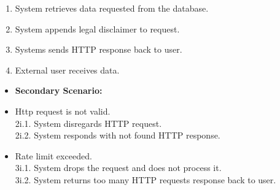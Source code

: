 \documentclass[]{article}
\begin{document}
\begin{enumerate}[{\bf BE1.}]
\begin{enumerate}[1.]
			\item System retrieves data requested from the database.
			\item System appends legal disclaimer to request.
			\item Systems sends HTTP response back to user.
			\item External user receives data.
		\end{enumerate}
		\begin{itemize}
			\item[] {\bf Secondary Scenario:}
			\item[2i.] Http request is not valid. \\
			\hspace{1cm}2i.1. System disregards HTTP request. \\
			\hspace{1cm}2i.2. System responds with not found HTTP response.
			\item[3i.] Rate limit exceeded. \\
			\hspace{1cm}3i.1. System drops the request and does not process it. \\
			\hspace{1cm}3i.2. System returns too many HTTP requests response back to user.
		\end{itemize}


\end{enumerate}
\end{document}
